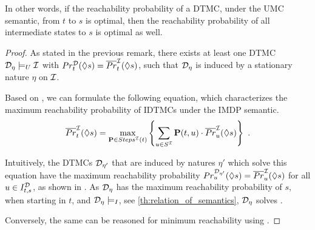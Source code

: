 In other words, if the reachability probability of a DTMC, under the UMC semantic, from $t$ to $s$ is optimal, then the reachability probability of all intermediate states to $s$ is optimal as well.

\begin{proof}
    As stated in the previous remark, there exists at least one DTMC $\mathcal{D}_{\eta}\models_U\mathcal{I}$ with $Pr_t^{\mathcal{D}}(\lozenge s) = \overline{Pr}^{\mathcal{I}}_t(\lozenge s)$, such that $\mathcal{D}_{\eta}$ is induced by a stationary nature $\eta$ on $\mathcal{I}$. 

    Based on \cite[Theorem 10.100]{Bibel}, we can formulate the following equation, which characterizes the maximum reachability probability of IDTMCs under the IMDP semantic.
    \begin{equation}\label{eq:maximum_reach_prob_MDPs}
        \overline{Pr}^{\mathcal{I}}_t(\lozenge s) = \max_{\mathbf{P} \in Steps^{\mathcal{I}}(t)} \left\{ \sum_{u\in S^{\mathcal{I}}} \mathbf{P}(t,u) \cdot \overline{Pr}^{\mathcal{I}}_u(\lozenge s)\right\} \ .
    \end{equation}

    Intuitively, the DTMCs $\mathcal{D}_{\eta'}$ that are induced by natures $\eta'$ which solve this equation have the maximum reachability probability $Pr^{\mathcal{D}_{\eta'}}_u(\lozenge s) = \overline{Pr}^{\mathcal{I}}_u(\lozenge s)$ for all $u\in I^{\mathcal{D}}_{t,s}$, as shown in \cite{Bibel}. As $\mathcal{D}_{\eta}$ has the maximum reachability probability of $s$, when starting in $t$, and $\mathcal{D}_{\eta}\models_I$, see \cref{th:relation_of_semantics}, $\mathcal{D}_{\eta}$ solves .


    Conversely, the same can be reasoned for minimum reachability using \cite[Theorem 10.109]{Bibel}.
\end{proof}

